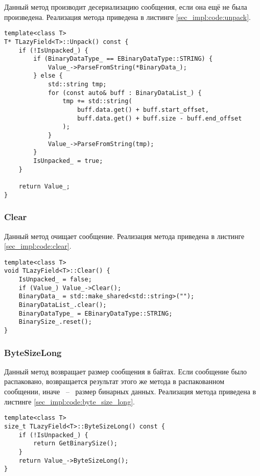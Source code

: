 Данный метод производит десериализацию сообщения, если она ещё не была произведена.
Реализация метода приведена в листинге \ref{sec_impl:code:unpack}.

\noindent\begin{minipage}{\linewidth}
\begin{lstlisting}[style=CodeListing, label=sec_impl:code:unpack, caption={Реализация метода Unpack}]
template<class T>
T* TLazyField<T>::Unpack() const {
    if (!IsUnpacked_) {
        if (BinaryDataType_ == EBinaryDataType::STRING) {
            Value_->ParseFromString(*BinaryData_);
        } else {
            std::string tmp;
            for (const auto& buff : BinaryDataList_) {
                tmp += std::string(
                    buff.data.get() + buff.start_offset,
                    buff.data.get() + buff.size - buff.end_offset
                );
            }
            Value_->ParseFromString(tmp);
        }
        IsUnpacked_ = true;
    }

    return Value_;
}
\end{lstlisting}
\end{minipage}
\pagebreak
\subsubsection{Clear}

Данный метод очищает сообщение.
Реализация метода приведена в листинге \ref{sec_impl:code:clear}.

\begin{lstlisting}[style=CodeListing, label=sec_impl:code:clear, caption={Реализация метода Clear}]
template<class T>
void TLazyField<T>::Clear() {
    IsUnpacked_ = false;
    if (Value_) Value_->Clear();
    BinaryData_ = std::make_shared<std::string>("");
    BinaryDataList_.clear();
    BinaryDataType_ = EBinaryDataType::STRING;
    BinarySize_.reset();
}
\end{lstlisting}
\vspace{-1em}
\subsubsection{ByteSizeLong} 

Данный метод возвращает размер сообщения в байтах. Если сообщение было распаковано, возвращается результат этого же метода в распакованном сообщении, иначе ~--~ размер бинарных данных.
Реализация метода приведена в листинге \ref{sec_impl:code:byte_size_long}.

\noindent\begin{minipage}{\linewidth}
\begin{lstlisting}[style=CodeListing, label=sec_impl:code:byte_size_long, caption={Реализация метода ByteSizeLong}]
template<class T>
size_t TLazyField<T>::ByteSizeLong() const {
    if (!IsUnpacked_) {
        return GetBinarySize();
    }
    return Value_->ByteSizeLong();
}
\end{lstlisting}
\end{minipage}
\vspace{-1em}
